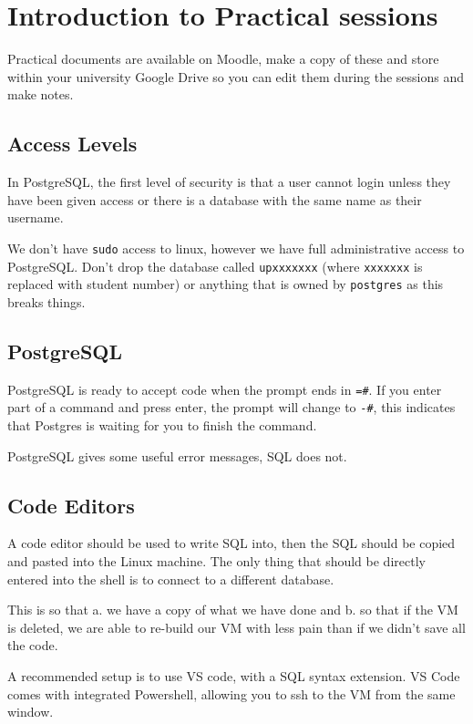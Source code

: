 
\section*{Introduction to Practical sessions}
Practical documents are available on Moodle, make a copy of these and store within your university Google Drive so you can edit them during the sessions and make notes.

\subsection*{Access Levels}
In PostgreSQL, the first level of security is that a user cannot login unless they have been given access or there is a database with the same name as their username.

We don't have \verb|sudo| access to linux, however we have full administrative access to PostgreSQL. 
Don't drop the database called \verb|upxxxxxxx| (where \verb|xxxxxxx| is replaced with student number) or anything that is owned by \verb|postgres| as this breaks things. 

\subsection*{PostgreSQL}
PostgreSQL is ready to accept code when the prompt ends in \verb|=#|. If you enter part of a command and press enter, the prompt will change to \verb|-#|, this indicates that Postgres is waiting for you to finish the command.

PostgreSQL gives some useful error messages, SQL does not. 

\subsection*{Code Editors}
A code editor should be used to write SQL into, then the SQL should be copied and pasted into the Linux machine. The only thing that should be directly entered into the shell is to connect to a different database.

This is so that a. we have a copy of what we have done and b. so that if the VM is deleted, we are able to re-build our VM with less pain than if we didn't save all the code.

A recommended setup is to use VS code, with a SQL syntax extension. VS Code comes with integrated Powershell, allowing you to ssh to the VM from the same window. 

